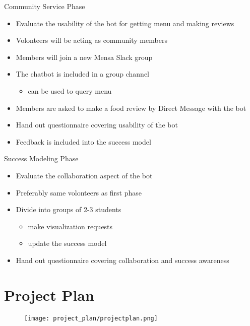 \begin{frame}{Community Service Phase}
  \begin{itemize}
    \item Evaluate the usability of the bot for getting menu and making reviews
    \item Volonteers will be acting as community members
    \item Members will join a new Mensa Slack group
    \item The chatbot is included in a group channel
          \begin{itemize}
            \item can be used to query menu
          \end{itemize}
    \item Members are asked to make a food review by Direct Message with the bot
    \item Hand out questionnaire covering usability of the bot
    \item Feedback is included into the success model
  \end{itemize}
\end{frame}

\begin{frame}{Success Modeling Phase}
  \begin{itemize}
    \item Evaluate the collaboration aspect of the bot
    \item Preferably same volonteers as first phase %
    \item Divide into groups of 2-3 students
          \begin{itemize}
            \item make visualization requests
            \item update the success model
          \end{itemize}
    \item Hand out questionnaire covering collaboration and success awareness
  \end{itemize}
\end{frame}

\section{Project Plan}

\begin{frame}
  \begin{figure}
    \centering
    \texttt{[image: project\_plan/projectplan.png]}

    \label{fig:visualReq}
  \end{figure}
\end{frame}